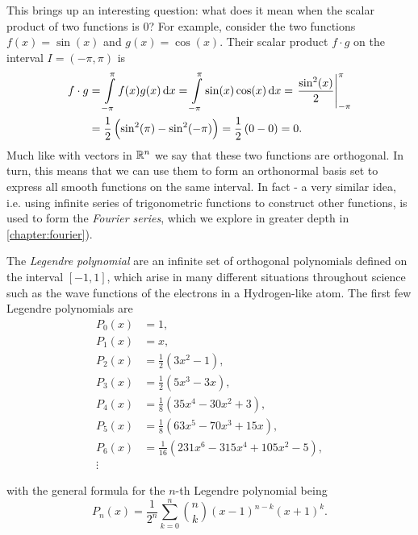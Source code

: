 This brings up an interesting question: what does it mean when the scalar product of two functions is $0$? For example, consider the two functions $f(x)=\sin(x)$ and $g(x)=\cos(x)$. Their scalar product $f\cdot g$ on the interval $I=\left(-\pi,\pi\right)$ is
	\begin{align*}
		f\cdot g &= \int\limits_{-\pi}^{\pi}f(x)g(x)\dif x  = \int\limits_{-\pi}^{\pi}\sin(x)\cos(x)\dif x  = \left.\frac{\sin^{2}(x)}{2}\right|_{-\pi}^{\pi}\nonumber\\
				 &= \frac{1}{2} \left( \sin^{2}(\pi)-\sin^{2}(-\pi) \right)  = \frac{1}{2} \left( 0-0 \right)  = 0.
	\end{align*}
	Much like with vectors in $\Rs[n]$ we say that these two functions are orthogonal. In turn, this means that we can use them to form an orthonormal basis set to express all smooth functions on the same interval. In fact - a very similar idea, i.e. using infinite series of trigonometric functions to construct other functions, is used to form the \emph{Fourier series}, which we explore in greater depth in \autoref{chapter:fourier}).

The \emph{Legendre polynomial} are an infinite set of orthogonal polynomials defined on the interval $[-1,1]$, which arise in many different situations throughout science such as the wave functions of the electrons in a Hydrogen-like atom. The first few Legendre polynomials are
\begin{align}
	P_{0}(x) &= 1,\nonumber\\
	P_{1}(x) &= x,\nonumber\\
	P_{2}(x) &= \frac{1}{2}\left(3x^{2}-1\right),\nonumber\\
	P_{3}(x) &= \frac{1}{2}\left(5x^{3}-3x\right),\nonumber\\
	P_{4}(x) &= \frac{1}{8}\left(35x^{4}-30x^{2}+3\right),\nonumber\\
	P_{5}(x) &= \frac{1}{8}\left(63x^{5}-70x^{3}+15x\right),\nonumber\\
	P_{6}(x) &= \frac{1}{16}\left(231x^{6}-315x^{4}+105x^{2}-5\right),\\
	\vdots\nonumber
	\label{eq:Legendre_polynomials_first_7}
\end{align}

with the general formula for the $n$-th Legendre polynomial being
\begin{equation}
	P_{n}(x) = \frac{1}{2^{n}}\sum\limits_{k=0}^{n}\binom{n}{k}\left(x-1\right)^{n-k}\left(x+1\right)^{k}.
	\label{eq:Legendre_polynomial_general}
\end{equation}

